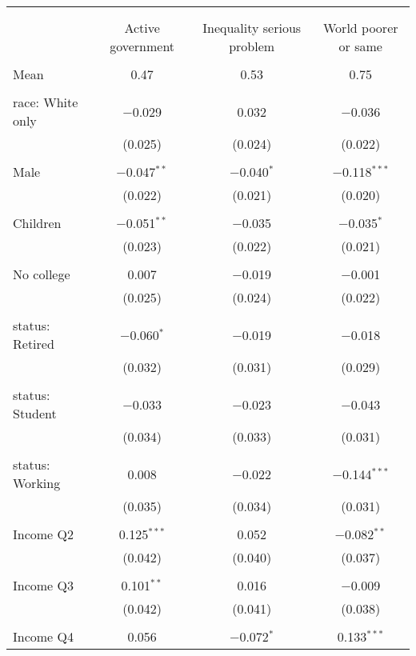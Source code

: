 
\begin{tabular}{@{\extracolsep{5pt}}lccc} 
\\[-1.8ex]\hline 
\hline \\[-1.8ex] 
\\[-1.8ex] & Active government & Inequality serious problem & World poorer or same \\ 
\hline \\[-1.8ex] 
 Mean & 0.47 & 0.53 & 0.75  \\ \hline \\[-1.8ex] race: White only & $-$0.029 & 0.032 & $-$0.036 \\ 
  & (0.025) & (0.024) & (0.022) \\ 
  & & & \\ 
 Male & $-$0.047$^{**}$ & $-$0.040$^{*}$ & $-$0.118$^{***}$ \\ 
  & (0.022) & (0.021) & (0.020) \\ 
  & & & \\ 
 Children & $-$0.051$^{**}$ & $-$0.035 & $-$0.035$^{*}$ \\ 
  & (0.023) & (0.022) & (0.021) \\ 
  & & & \\ 
 No college & 0.007 & $-$0.019 & $-$0.001 \\ 
  & (0.025) & (0.024) & (0.022) \\ 
  & & & \\ 
 status: Retired & $-$0.060$^{*}$ & $-$0.019 & $-$0.018 \\ 
  & (0.032) & (0.031) & (0.029) \\ 
  & & & \\ 
 status: Student & $-$0.033 & $-$0.023 & $-$0.043 \\ 
  & (0.034) & (0.033) & (0.031) \\ 
  & & & \\ 
 status: Working & 0.008 & $-$0.022 & $-$0.144$^{***}$ \\ 
  & (0.035) & (0.034) & (0.031) \\ 
  & & & \\ 
 Income Q2 & 0.125$^{***}$ & 0.052 & $-$0.082$^{**}$ \\ 
  & (0.042) & (0.040) & (0.037) \\ 
  & & & \\ 
 Income Q3 & 0.101$^{**}$ & 0.016 & $-$0.009 \\ 
  & (0.042) & (0.041) & (0.038) \\ 
  & & & \\ 
 Income Q4 & 0.056 & $-$0.072$^{*}$ & 0.133$^{***}$ \\ 

\end{tabular}
